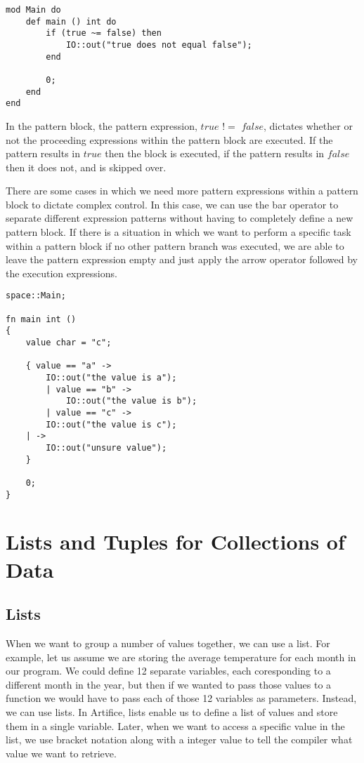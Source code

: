 \documentclass{article}
\begin{document}
\begin{lstlisting}
mod Main do
	def main () int do
		if (true ~= false) then
			IO::out("true does not equal false");
		end
	
		0;
	end
end
\end{lstlisting}

In the pattern block, the pattern expression, $true$ $!=$ $false$, dictates whether or not the proceeding expressions within the pattern block are executed. If the pattern
results in $true$ then the block is executed, if the pattern results in $false$ then it does not, and is skipped over.

There are some cases in which we need more pattern expressions within a pattern block to dictate complex control. In this case, we can use the bar operator to separate different
expression patterns without having to completely define a new pattern block. If there is a situation in which we want to perform a specific task within a pattern block if no other
pattern branch was executed, we are able to leave the pattern expression empty and just apply the arrow operator followed by the execution expressions.

\begin{lstlisting}
space::Main;

fn main int ()
{
	value char = "c";

 	{ value == "a" ->
  		IO::out("the value is a");
    	| value == "b" ->
     		IO::out("the value is b");
        | value == "c" ->
		IO::out("the value is c");
  	| ->
   		IO::out("unsure value");
  	}

	0;
}
\end{lstlisting}


\section{Lists and Tuples for Collections of Data}

\subsection{Lists}

When we want to group a number of values together, we can use a list. For example, let us assume we are storing the average temperature for each month in our program.
We could define 12 separate variables, each coresponding to a different month in the year, but then if we wanted to pass those values to a function we would have to pass
each of those 12 variables as parameters. Instead, we can use lists. In Artifice, lists enable us to define a list of values and store them in a single variable.
Later, when we want to access a specific value in the list, we use bracket notation along with a integer value to tell the compiler what value we want to retrieve.
\end{document}
